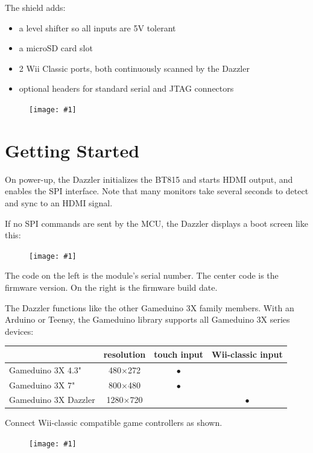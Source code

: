\documentclass{article}
\newcommand{\dev}{Dazzler}
\newcommand{\png}[1]{
\begin{figure}[H]
\begin{center}
\texttt{[image: \#1]}
\end{center}
\end{figure}
}
\newcommand{\pngw}[2]{
\begin{figure}[H]
\begin{center}
\texttt{[image: \#1]}
\end{center}
\end{figure}
}
\newcommand{\gap}{\vspace{10pt}}
\begin{document}
\noindent
The shield adds:
\begin{itemize}
\item a level shifter so all inputs are 5V tolerant 
\item a microSD card slot 
\item 2 Wii Classic ports, both continuously scanned by the Dazzler 
\item optional headers for standard serial and JTAG connectors 
\end{itemize}

\png{img/gameduino-3x-dazzler/rot-0182}

\newpage
\section{Getting Started}

On power-up, the \dev{}
initializes the BT815 and starts HDMI output, 
and enables the SPI interface. 
Note that many monitors take several seconds to detect and sync to an HDMI signal.

If no SPI commands are sent by the MCU,
the \dev{}
displays a boot screen like this:

\pngw{img/gameduino-3x-dazzler/boot}{1.0}

The code on the left is the module's serial number. 
The center code is the firmware version. 
On the right is the firmware build date.

The Dazzler functions like the other Gameduino 3X family members.
With an Arduino or Teensy, the Gameduino library supports all Gameduino 3X series devices:

\gap
\begin{tabular}{lccc}

       & resolution & touch input & Wii-classic input \\
\hline

Gameduino 3X 4.3"    & 480$\times$272 & $\bullet$ & \\
Gameduino 3X 7"      & 800$\times$480 & $\bullet$ & \\
Gameduino 3X Dazzler & 1280$\times$720 & & $\bullet$ \\
\hline

\end{tabular}

\newpage
Connect Wii-classic compatible game controllers as shown.
\png{img/gameduino-3x-dazzler/wii-plug}
\end{document}
